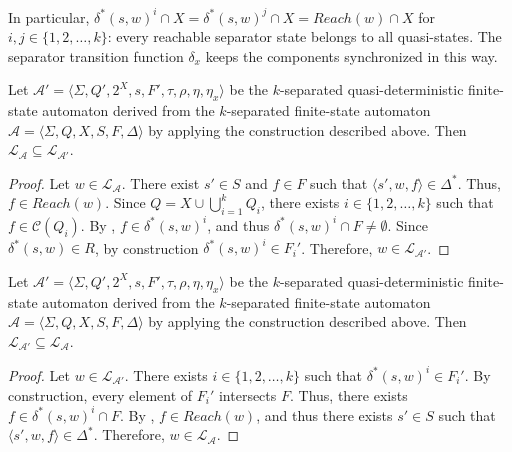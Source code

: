 In particular, $\delta^*(s, w)^i \cap X = \delta^*(s, w)^j \cap X = Reach(w) \cap X$
for $i, j \in \{ 1, 2, \ldots, k \}$: every reachable separator state belongs to all
quasi-states. The separator transition function $\delta_x$ keeps the components
synchronized in this way.

\begin{lemma}\label{lem:quasidet_inclusion_right}
  Let $\mathcal{A}' = \langle \Sigma, Q', 2^X, s, F', \tau, \rho, \eta, \eta_x
  \rangle$ be the $k$-separated quasi-deterministic finite-state automaton derived
  from the $k$-separated finite-state automaton $\mathcal{A} = \langle \Sigma, Q, X,
  S, F, \Delta \rangle$ by applying the construction described above. Then
  $\mathcal{L}_\mathcal{A} \subseteq \mathcal{L}_{\mathcal{A}'}$.
\end{lemma}

\begin{proof}
  Let $w \in \mathcal{L}_\mathcal{A}$. There exist $s' \in S$ and $f \in F$ such that
  $\langle s', w, f \rangle \in \Delta^*$. Thus, $f \in Reach(w)$. Since $Q = X \cup
  \bigcup_{i=1}^k Q_i$, there exists $i \in \{ 1, 2, \ldots, k \}$ such that $f \in
  \mathcal{C}(Q_i)$. By , $f \in \delta^*(s, w)^i$, and
  thus $\delta^*(s, w)^i \cap F \neq \emptyset$. Since $\delta^*(s, w) \in R$, by
  construction $\delta^*(s, w)^i \in F_i'$. Therefore, $w \in
  \mathcal{L}_{\mathcal{A}'}$.
\end{proof}

\begin{lemma}\label{lem:quasidet_inclusion_left}
  Let $\mathcal{A}' = \langle \Sigma, Q', 2^X, s, F', \tau, \rho, \eta, \eta_x
  \rangle$ be the $k$-separated quasi-deterministic finite-state automaton derived
  from the $k$-separated finite-state automaton $\mathcal{A} = \langle \Sigma, Q, X,
  S, F, \Delta \rangle$ by applying the construction described above. Then
  $\mathcal{L}_{\mathcal{A}'} \subseteq \mathcal{L}_\mathcal{A}$.
\end{lemma}

\begin{proof}
  Let $w \in \mathcal{L}_{\mathcal{A}'}$. There exists $i \in \{ 1, 2, \ldots, k \}$
  such that $\delta^*(s, w)^i \in F_i'$. By construction, every element of $F_i'$
  intersects $F$. Thus, there exists $f \in \delta^*(s, w)^i \cap F$. By
  , $f \in Reach(w)$, and thus there exists $s' \in S$
  such that $\langle s', w, f \rangle \in \Delta^*$. Therefore, $w \in
  \mathcal{L}_\mathcal{A}$.
\end{proof}

